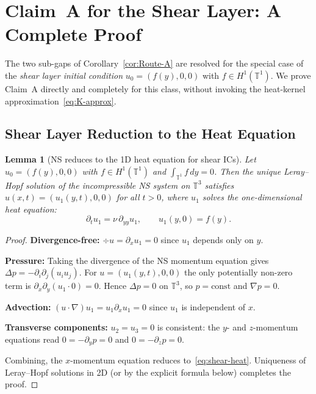\documentclass[11pt]{article}
\newtheorem{lemma}[theorem]{Lemma}
\theoremstyle{definition}
\theoremstyle{remark}
\newcommand{\T}{\mathbb{T}}
\begin{document}
\section{Claim~A for the Shear Layer: A Complete Proof}
\label{sec:shear-theorem}

The two sub-gaps of Corollary~\ref{cor:Route-A} are resolved for the
special case of the \emph{shear layer initial condition}
$u_0 = (f(y),0,0)$ with $f\in H^1(\T^1)$.
We prove Claim~A directly and completely for this class, without
invoking the heat-kernel approximation~\eqref{eq:K-approx}.

\subsection{Shear Layer Reduction to the Heat Equation}
\label{sec:shear-heat}

\begin{lemma}[NS reduces to the 1D heat equation for shear ICs]
\label{lem:shear-heat}
  Let $u_0=(f(y),0,0)$ with $f\in H^1(\T^1)$ and $\int_{\T^1}f\,dy=0$.
  Then the unique Leray--Hopf solution of the incompressible NS system
  on $\T^3$ satisfies $u(x,t)=(u_1(y,t),0,0)$ for all $t>0$, where
  $u_1$ solves the \emph{one-dimensional heat equation}:
  \begin{equation}\label{eq:shear-heat}
    \partial_t u_1 = \nu\,\partial_{yy}u_1,\qquad
    u_1(y,0)=f(y).
  \end{equation}
\end{lemma}

\begin{proof}
  \textbf{Divergence-free:} $\div u = \partial_x u_1 = 0$ since $u_1$
  depends only on $y$. \checkmark

  \textbf{Pressure:}  Taking the divergence of the NS momentum equation
  gives $\Delta p = -\partial_i\partial_j(u_iu_j)$.  For $u=(u_1(y,t),0,0)$
  the only potentially non-zero term is $\partial_x\partial_y(u_1\cdot 0)=0$.
  Hence $\Delta p=0$ on $\T^3$, so $p=\text{const}$ and $\nabla p=0$.

  \textbf{Advection:} $(u\cdot\nabla)u_1 = u_1\partial_x u_1 = 0$
  since $u_1$ is independent of $x$.

  \textbf{Transverse components:} $u_2=u_3=0$ is consistent: the
  $y$- and $z$-momentum equations read $0 = -\partial_y p = 0$ and
  $0=-\partial_z p=0$.

  Combining, the $x$-momentum equation reduces to~\eqref{eq:shear-heat}.
  Uniqueness of Leray--Hopf solutions in 2D (or by the explicit formula
  below) completes the proof.
\end{proof}
\end{document}
